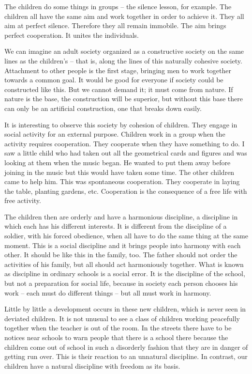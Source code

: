 \documentclass[lang=cn,10pt]{elegantbook}
\begin{document}
The children do some things in groups – the silence lesson, for example. The children all have the same aim and work together in order to achieve it. They all aim at perfect silence. Therefore they all remain immobile. The aim brings perfect cooperation. It unites the individuals.

We can imagine an adult society organized as a constructive society on the same lines as the children’s – that is, along the lines of this naturally cohesive society. Attachment to other people is the first stage, bringing men to work together towards a common goal. It would be good for everyone if society could be constructed like this. But we cannot demand it; it must come from nature. If nature is the base, the construction will be superior, but without this base there can only be an artificial construction, one that breaks down easily.

It is interesting to observe this society by cohesion of children. They engage in social activity for an external purpose. Children work in a group when the activity requires cooperation. They cooperate when they have something to do. I saw a little child who had taken out all the geometrical cards and figures and was looking at them when the music began. He wanted to put them away before joining in the music but this would have taken some time. The other children came to help him. This was spontaneous cooperation. They cooperate in laying the table, planting gardens, etc. Cooperation is the consequence of a free life with free activity.

The children then are orderly and have a harmonious discipline, a discipline in which each has his different interests. It is different from the discipline of a soldier, with his forced obedience, when all have to do the same thing at the same moment. This is a social discipline and it brings people into harmony with each other. It should be like this in the family, too. The father should not order the activities of his family, but all should act harmoniously together. What is known as discipline in ordinary schools is a social error. It is the discipline of the school, but not a preparation for social life, because in society each person chooses his work – each must do different things – but all must work in harmony.

Little by little a development occurs in these new children, which is never seen in deviated children. It is not unusual to see a class of children working peacefully together when the teacher is out of the room. In the streets there have to be notices near schools to warn people that there is a school there because the children come out of school in such a disorderly fashion that they are in danger of getting run over. This is their reaction to an unnatural discipline. In contrast, our children have a natural discipline with freedom as its basis.
\end{document}
